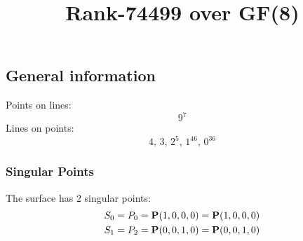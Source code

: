\documentclass{article}
\newcommand\setTBstruts{\def\T{\rule{0pt}{2.6ex}}%
\def\B{\rule[-1.2ex]{0pt}{0pt}}}
\newcommand{\bP}{{\bf P}}
\begin{document}
 
\setTBstruts



{\allowdisplaybreaks%






\title{Rank-74499 over GF(8)}
\author{}%
\maketitle%
%
{}



\subsection*{General information}
Points on lines:
$$
9^7$$
Lines on points:
$$
4,\,3,\,2^5,\,1^{46},\,0^{36}$$
\subsubsection*{Singular Points}
The surface has 2 singular points:\\
\begin{align*}
S_{0} &= P_{0}=\bP(1, 0, 0, 0) = \bP(1, 0, 0, 0)\\
S_{1} &= P_{2}=\bP(0, 0, 1, 0) = \bP(0, 0, 1, 0)\\
\end{align*}
}
\end{document}

